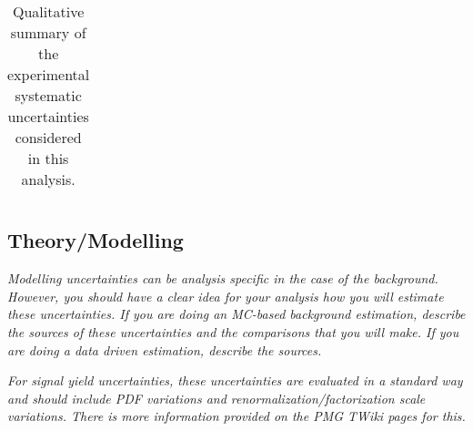 \begin{table}[h]
\begin{center}
\begin{tabular}{ll}
			\bottomrule
		\end{tabular}
	\end{center}
	\caption{ Qualitative summary of the experimental systematic uncertainties considered in this analysis.}
	\label{tab:syst_summary_sources}
\end{table}


\subsection{Theory/Modelling}

\textit{Modelling uncertainties can be analysis specific in the case of the background.  However, you should 
have a clear idea for your analysis how you will estimate these uncertainties.  If you are doing 
an MC-based background estimation, describe the sources of these uncertainties and the comparisons that
you will make.  If you are doing a data driven estimation, describe the sources.}

\textit{For signal yield uncertainties, these uncertainties are evaluated in a standard way and should 
include PDF variations and renormalization/factorization scale variations.  There is more information
provided on the PMG TWiki pages for this.}


\clearpage
